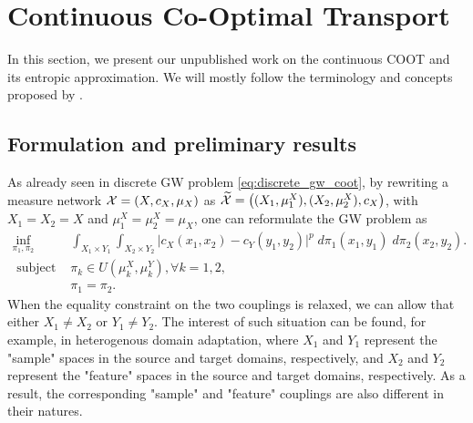 \section{Continuous Co-Optimal Transport} \label{sec:continuous_coot}

In this section, we present our unpublished work on the continuous COOT and its entropic approximation.
We will mostly follow the terminology and concepts proposed by \citet{Chowdhury21b}.

\subsection{Formulation and preliminary results}

As already seen in discrete GW problem \eqref{eq:discrete_gw_coot},
by rewriting a measure network $\mathcal X = (X, c_X, \mu_X)$ as
$\widetilde{\mathcal X} = \big((X_1, \mu_1^X), (X_2, \mu_2^X), c_X \big)$, with
$X_1 = X_2 = X$ and $\mu_1^X = \mu^X_2 = \mu_X$, one can reformulate the GW problem as
\begin{equation}
  \begin{split}
    \inf_{\pi_1, \pi_2}
    &\int_{X_1 \times Y_1} \int_{X_2 \times Y_2}
    \big\vert c_X(x_1, x_2) - c_Y(y_1, y_2) \big\vert^p \; d\pi_1(x_1, y_1) \; d\pi_2(x_2, y_2). \\
    \text{ subject to: } &\pi_k \in U(\mu_k^X, \mu_k^Y), \forall k = 1,2, \\
    &\pi_1 = \pi_2.
  \end{split}
\end{equation}
When the equality constraint on the two couplings is relaxed,
we can allow that either $X_1 \neq X_2$ or $Y_1 \neq Y_2$.
The interest of such situation can be found, for example, in heterogenous domain adaptation,
where $X_1$ and $Y_1$ represent the "sample" spaces in the source and target domains, respectively,
and $X_2$ and $Y_2$ represent the "feature" spaces in the source and target domains, respectively.
As a result, the corresponding "sample" and "feature" couplings are also different in their natures.


